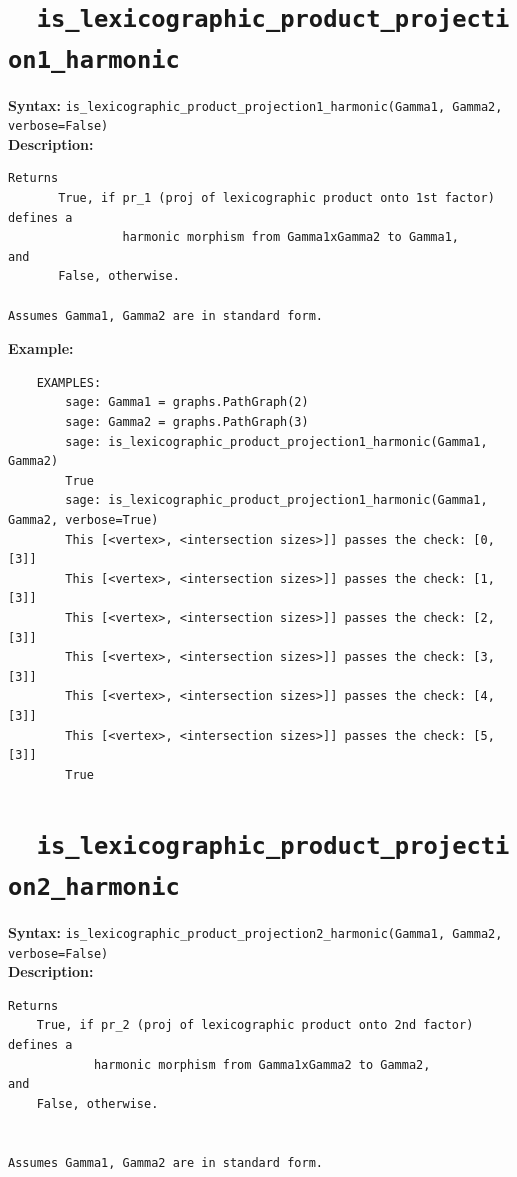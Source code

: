 \documentclass{article}
\begin{document}
\section{\tt \ \ is\_lexicographic\_product\_projection1\_harmonic}

\textbf{Syntax:} \verb}is_lexicographic_product_projection1_harmonic(Gamma1, Gamma2, verbose=False)}\\

\textbf{Description:}
\begin{verbatim}
Returns 
       True, if pr_1 (proj of lexicographic product onto 1st factor) defines a 
                harmonic morphism from Gamma1xGamma2 to Gamma1, 
and 
       False, otherwise. 

Assumes Gamma1, Gamma2 are in standard form.
\end{verbatim}

\textbf{Example:}
\begin{verbatim}
    EXAMPLES:
        sage: Gamma1 = graphs.PathGraph(2)
        sage: Gamma2 = graphs.PathGraph(3)
        sage: is_lexicographic_product_projection1_harmonic(Gamma1, Gamma2) 
        True
        sage: is_lexicographic_product_projection1_harmonic(Gamma1, Gamma2, verbose=True) 
        This [<vertex>, <intersection sizes>]] passes the check: [0, [3]]
        This [<vertex>, <intersection sizes>]] passes the check: [1, [3]]
        This [<vertex>, <intersection sizes>]] passes the check: [2, [3]]
        This [<vertex>, <intersection sizes>]] passes the check: [3, [3]]
        This [<vertex>, <intersection sizes>]] passes the check: [4, [3]]
        This [<vertex>, <intersection sizes>]] passes the check: [5, [3]]
        True
\end{verbatim}

\section{\tt \ \ is\_lexicographic\_product\_projection2\_harmonic}

\textbf{Syntax:} \verb}is_lexicographic_product_projection2_harmonic(Gamma1, Gamma2, verbose=False)}\\

\textbf{Description:}
\begin{verbatim}
Returns
    True, if pr_2 (proj of lexicographic product onto 2nd factor) defines a 
            harmonic morphism from Gamma1xGamma2 to Gamma2,
and
    False, otherwise. 


Assumes Gamma1, Gamma2 are in standard form.
\end{verbatim}
\end{document}
